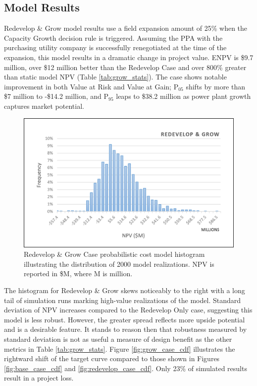 \subsection{Model Results}\label{ch6:grow_results}
Redevelop \& Grow model results use a field expansion amount of 25\% when the Capacity Growth decision rule is triggered. Assuming the PPA with the purchasing utility company is successfully renegotiated at the time of the expansion, this model results in a dramatic change in project value. ENPV is \$9.7 million, over \$12 million better than the Redevelop Case and over 800\% greater than static model NPV (Table \ref{tab:grow_stats}). The case shows notable improvement in both Value at Risk and Value at Gain; P$_{05}$ shifts by more than \$7 million to -\$14.2 million, and P$_{95}$ leaps to \$38.2 million as power plant growth captures market potential.

\begin{figure}[!htp]
\centering
\includegraphics[width=.85\textwidth]{templates/images/Figure-Grow_Case_Histogram.png}
\caption[Redevelop \& Grow Case histogram]{Redevelop \& Grow Case probabilistic cost model histogram illustrating the distribution of 2000 model realizations. NPV is reported in \$M, where M is million.}
\label{fig:grow_case_hist}
\end{figure}

The histogram for Redevelop \& Grow skews noticeably to the right with a long tail of simulation runs marking high-value realizations of the model. Standard deviation of NPV increases compared to the Redevelop Only case, suggesting this model is less robust. However, the greater spread reflects more upside potential and is a desirable feature. It stands to reason then that robustness measured by standard deviation is not as useful a measure of design benefit as the other metrics in Table \ref{tab:grow_stats}. Figure \ref{fig:grow_case_cdf} illustrates the rightward shift of the target curve compared to those shown in Figures \ref{fig:base_case_cdf} and \ref{fig:redevelop_case_cdf}. Only 23\% of simulated results result in a project loss. 

